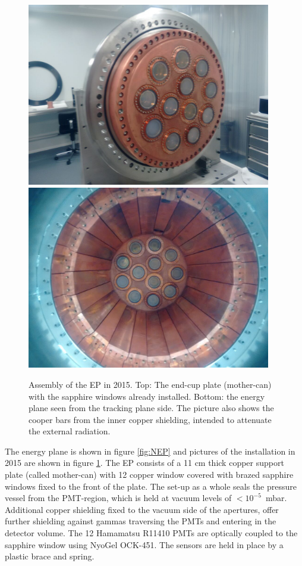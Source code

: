 \begin{figure}[hpt!]
\centering
\includegraphics[height=8cm]{img2/EP_ENDCUP.png}
\includegraphics[height=8cm]{img2/EPI.png}
\caption{Assembly of the EP in 2015. Top: The end-cup plate (mother-can) with the sapphire windows already installed. Bottom: the energy plane seen from the tracking plane side. The picture also shows the cooper bars from the inner copper shielding, intended to attenuate the external radiation. } \label{fig.EPA}
\end{figure}

The energy plane is shown in figure \ref{fig:NEP} and pictures of the installation in 2015 are shown in
figure \ref{fig.EPA}. The EP 
consists of a 11 cm thick copper support plate (called mother-can) with 12 copper window
covered with brazed sapphire windows fixed to the front of the plate. The
set-up as a whole seals the pressure vessel from the PMT-region,
which is held at vacuum levels of
$<10^{-5}$~mbar. Additional copper shielding fixed to the
vacuum side of the apertures, offer further shielding against gammas traversing the PMTs and
entering in the detector volume. The 12 Hamamatsu R11410 PMTs are optically coupled to 
the sapphire window using NyoGel OCK-451. The sensors are held in place by a plastic brace and spring.

